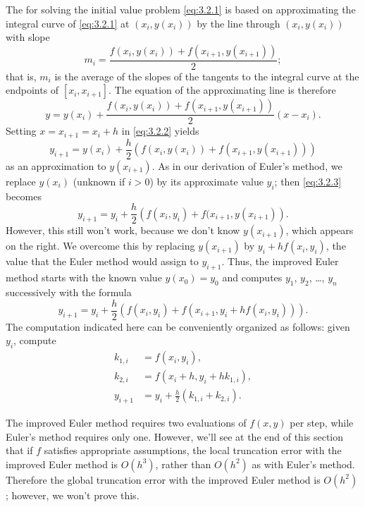 The
 for solving the initial value
problem \eqref{eq:3.2.1} is based on approximating the integral curve of
\eqref{eq:3.2.1} at $(x_i,y(x_i))$ by the line through $(x_i,y(x_i))$ with
slope
\[
m_i=\frac{f(x_i,y(x_i))+f(x_{i+1},y(x_{i+1}))}{2};
\]
that is, $m_i$ is the average of the slopes of the tangents to the
integral curve at the endpoints of $[x_i,x_{i+1}]$. The equation of
the approximating line is therefore
\begin{equation} \label{eq:3.2.2}
y=y(x_i)+\frac{f(x_i,y(x_i))+f(x_{i+1},y(x_{i+1}))}{2}(x-x_i).
\end{equation}
Setting $x=x_{i+1}=x_i+h$ in \eqref{eq:3.2.2} yields
\begin{equation} \label{eq:3.2.3}
y_{i+1}=y(x_i)+\frac{h}{2}\left(f(x_i,y(x_i))+f(x_{i+1},y(x_{i+1}))\right)
\end{equation}
as an approximation to $y(x_{i+1})$. As in our derivation of Euler's
method, we replace $y(x_i)$ (unknown if $i>0$) by its
approximate value $y_i$; then \eqref{eq:3.2.3} becomes
\[
y_{i+1}=y_i+\frac{h}{2}\left(f(x_i,y_i)+f(x_{i+1},y(x_{i+1})\right).
\]
However, this still won't work, because we don't know $y(x_{i+1})$,
which appears on the right. We overcome this by replacing $y(x_{i+1})$
by $y_i+hf(x_i,y_i)$, the value that the  Euler method would
assign to $y_{i+1}$. Thus,  the improved Euler method
starts with the known value $y(x_0)=y_0$ and computes
$y_1$, $y_2$, \dots, $y_n$ successively with the formula
\begin{equation} \label{eq:3.2.4}
y_{i+1}=y_i+\frac{h}{2}\left(f(x_i,y_i)+f(x_{i+1},y_i+hf(x_i,y_i))\right).
\end{equation}
The computation indicated here can be conveniently organized as
follows: given $y_i$, compute
\begin{align*}
k_{1,i}&=f(x_i,y_i),\\
k_{2,i}&=f\left(x_i+h,y_i+hk_{1,i}\right),\\
y_{i+1}&=y_i+\frac{h}{2}(k_{1,i}+k_{2,i}).
\end{align*}

The improved Euler method requires two evaluations of $f(x,y)$ per
step, while Euler's method requires only one. However, we'll see at
the end of this section that if $f$ satisfies appropriate assumptions,
 the local truncation error with the improved Euler method is
$O(h^3)$,
rather than $O(h^2)$ as with Euler's method. Therefore
the global truncation
error
with the improved Euler method is $O(h^2)$; however, we won't prove this.

